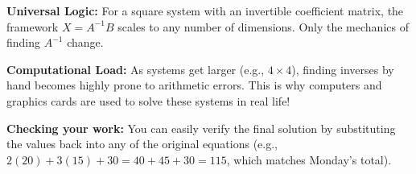 \begin{takeaways}
\item \textbf{Universal Logic:} For a square system with an invertible coefficient matrix, the framework $X = A^{-1}B$ scales to any number of dimensions. Only the mechanics of finding $A^{-1}$ change.
\item \textbf{Computational Load:} As systems get larger (e.g., $4 \times 4$), finding inverses by hand becomes highly prone to arithmetic errors. This is why computers and graphics cards are used to solve these systems in real life!
\item \textbf{Checking your work:} You can easily verify the final solution by substituting the values back into any of the original equations (e.g., $2(20) + 3(15) + 30 = 40 + 45 + 30 = 115$, which matches Monday's total).
\end{takeaways}
